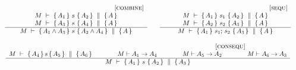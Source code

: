 \begin{figure}[htb]
$
\begin{array}{c}
\begin{array}{lcl}
\inferruleSD{[\sc{combine}]}
	{  \begin{array}{l}
	\hprovesN{M}  {A_1} {\ s\ } {A_2}  {A} \\ %
	\hprovesN{M}  {A_3} {\ s\ } {A_4} {A}
	\end{array}
	}
	{ \hprovesN{M}  {A_1 \wedge A_3 }{\ s\ } {A_2 \wedge A_4} {A} }
& &
\inferruleSD{[\sc{sequ}]}
	{  \begin{array}{l} 
	\hprovesN{M}  {A_1} {\ s_1\ } {A_2}  {A}  \\ %
	\hprovesN{M}  {A_2} {\ s_2\ } {A_3} {A}
	\end{array}
	}
	{   \hprovesN{M}  {A_1   }{\ s_1; \, s_2\ } {  A_3} {A} }
\end{array}
\\ \\
\inferruleSD{ \hspace{3cm} [\sc{consequ}]}
	{
	 { \hprovesN  {M}  {A_4} {\, s\, } { A_5} {A_6}  }
	 \hspace{1.4cm} 
	 M \vdash A_1 \rightarrow A_4 
	 \hspace{1.4cm} 
	{ M \vdash A_5   \rightarrow  A_2  }
	 \hspace{1.4cm}   
	{  M \vdash A_6 \rightarrow A_3 }
	}
	{   \hprovesN{M}  {A_1 }{\ s\ } {A_2} {A_3} }
  \end{array}
 $
 

\end{figure}
